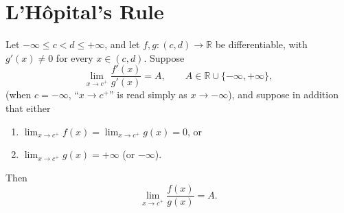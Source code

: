 \documentclass{essay}
\begin{document}
\section{L'H\^opital's Rule}

\begin{theorem}[L'H\^opital]
  Let \(-\infty \le c < d \le +\infty\), and let \(f,g:(c,d)\to\mathbb{R}\) be differentiable, with \(g'(x)\neq 0\) for every \(x\in(c,d)\). Suppose
  \[ \lim_{x\to c^+} \frac{f'(x)}{g'(x)} = A, \qquad A\in\mathbb{R}\cup\{-\infty,+\infty\}, \]
  (when \(c=-\infty\), ``\(x\to c^+\)'' is read simply as \(x\to-\infty\)), and suppose in addition that either
  \begin{enumerate}
    \item[(a)] \(\displaystyle \lim_{x\to c^+} f(x) = \lim_{x\to c^+} g(x) = 0\), \quad or
    \item[(b)] \(\displaystyle \lim_{x\to c^+} g(x) = +\infty\) \; (or \(-\infty\)).
  \end{enumerate}
  Then
  \[ \lim_{x\to c^+} \frac{f(x)}{g(x)} = A. \]
\end{theorem}
\end{document}
